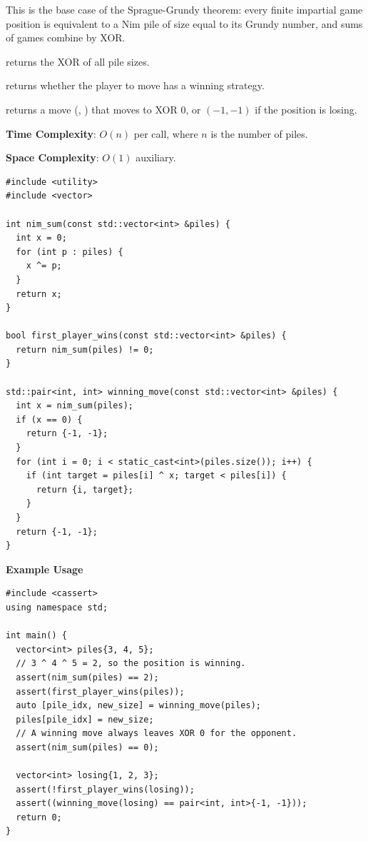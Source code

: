 This is the base case of the Sprague-Grundy theorem: every finite impartial game position is equivalent to a Nim pile of size equal to its Grundy number, and sums of games combine by XOR.

\begin{compactitem}
  \item {} returns the XOR of all pile sizes.
  \item {} returns whether the player to move has a winning strategy.
  \item {} returns a move (, ) that moves to XOR $0$, or $(-1, -1)$ if the position is losing.
\end{compactitem}

\textbf{Time Complexity}: $O(n)$ per call, where $n$ is the number of piles.

\textbf{Space Complexity}: $O(1)$ auxiliary.

\begin{lstlisting}[style=cpp]
#include <utility>
#include <vector>

int nim_sum(const std::vector<int> &piles) {
  int x = 0;
  for (int p : piles) {
    x ^= p;
  }
  return x;
}

bool first_player_wins(const std::vector<int> &piles) {
  return nim_sum(piles) != 0;
}

std::pair<int, int> winning_move(const std::vector<int> &piles) {
  int x = nim_sum(piles);
  if (x == 0) {
    return {-1, -1};
  }
  for (int i = 0; i < static_cast<int>(piles.size()); i++) {
    if (int target = piles[i] ^ x; target < piles[i]) {
      return {i, target};
    }
  }
  return {-1, -1};
}
\end{lstlisting}
\textbf{Example Usage}\par
\begin{lstlisting}[style=cpp]
#include <cassert>
using namespace std;

int main() {
  vector<int> piles{3, 4, 5};
  // 3 ^ 4 ^ 5 = 2, so the position is winning.
  assert(nim_sum(piles) == 2);
  assert(first_player_wins(piles));
  auto [pile_idx, new_size] = winning_move(piles);
  piles[pile_idx] = new_size;
  // A winning move always leaves XOR 0 for the opponent.
  assert(nim_sum(piles) == 0);

  vector<int> losing{1, 2, 3};
  assert(!first_player_wins(losing));
  assert((winning_move(losing) == pair<int, int>{-1, -1}));
  return 0;
}
\end{lstlisting}
